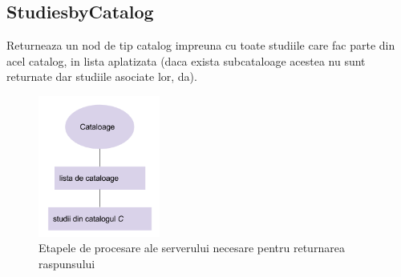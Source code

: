 \subsection{StudiesbyCatalog}

Returneaza un nod de tip catalog impreuna cu toate studiile care fac
parte din acel catalog, in lista aplatizata (daca exista subcataloage
acestea nu sunt returnate dar studiile asociate lor, da).

\begin{figure}[H]
\begin{centering}
\includegraphics[width=4cm]{img/studiesbycatalog}
\par\end{centering}
\caption{Etapele de procesare ale serverului necesare pentru returnarea raspunsului}
\end{figure}

